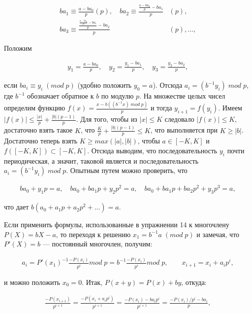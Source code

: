 \documentclass{mai_book}
\begin{document}
$$
\begin{aligned}
ba_1\equiv \frac{a-ba_0}{p}(p),\quad ba_2\equiv \frac{\frac{a-ba_0}{p}-ba_1}{p}&(p),\\
ba_3\equiv \frac{\frac{\frac{a-ba_0}{p}-ba_1}{p}-ba_2}{p}&(p),\dots,
\end{aligned}
$$

\medskip
\noindent Положим

$$
\begin{aligned}
y_1=\frac{a-ba_0}{p},\quad y_2=\frac{y_1-ba_1}{p},\quad y_3=\frac{y_2-ba_2}{p},
\end{aligned}
$$

\medskip
\noindent если $ba_i\equiv y_i\; (mod\; p)$ (удобно положить $y_0=a$). Отсюда $a_i=(b^{-1}y_i)\; mod\; p$, где $b^{-1}$ обозначает обратное к $b$ по модулю $p$. На множестве целых чисел определим функцию $f(x)=\frac{x-b((b^{-1}x)\; mod\; p)}{p}$ и тогда $y_{i+1}=f(y_i)$. Имеем $|f(x)|\leq\frac{|x|}{p}+\frac{|b|(p-1)}{p}$. Для того, чтобы из $|x|\leq K$ следовало $|f(x)|\leq K$, достаточно взять такое $K$, что $\frac{K}{p}+\frac{|b|(p-1)}{p}\leq K$, что
выполняется при $K\geq |b|$. Достаточно теперь взять $K\geq max(|a|,|b|)$, чтобы $a\in [-K,K]$ и $f([-K,K])\subset [-K,K]$. Отсюда выводим, что по­следовательность $y_i$ почти периодическая, а значит, таковой является
и последовательность $a_i=(b^{-1}y_i)\; mod\; p$. Опытным путем можно про­верить, что

$$
\begin{aligned}
ba_0+y_1p=a,\quad ba_0+ba_1p+y_2p^2=a,\quad ba_0+ba_1p+ba_2p^2+y_3p^3=a,
\end{aligned}
$$

\medskip
\noindent что дает $b(a_0+a_1p+a_2p^2+\dots)=a$.

Если применить формулы, использованные в упражнении 14 к многочлену $P(X)=bX-a$, то переходя к решению $x_1=b^{-1}a\; (mod\; p)$ и замечая, что $P'(X)=b$ --- постоянный многочлен, получим:

$$
\begin{aligned}
a_i=P'(x_1)^{-1}\frac{-P(x_i)}{p^i}mod\; p=b^{-1}\frac{-P(x_i)}{p^i}mod\; p,\qquad x_{i+1}=x_i+a_ip^i,
\end{aligned}
$$

\medskip
\noindent и можно положить $x_0=0$. Итак, $P(x+y)=P(x)+by$, откуда: 

$$
\begin{aligned}
\frac{-P(x_{i+1})}{p^{i+1}}=\frac{-P(x_i+a_ip^i)}{p^{i+1}}=\frac{-P(x_i)-ba_ip^i}{p^{i+1}}=\frac{-P(x_i)/p^i-ba_i}{p},
\end{aligned}
$$
\end{document}
